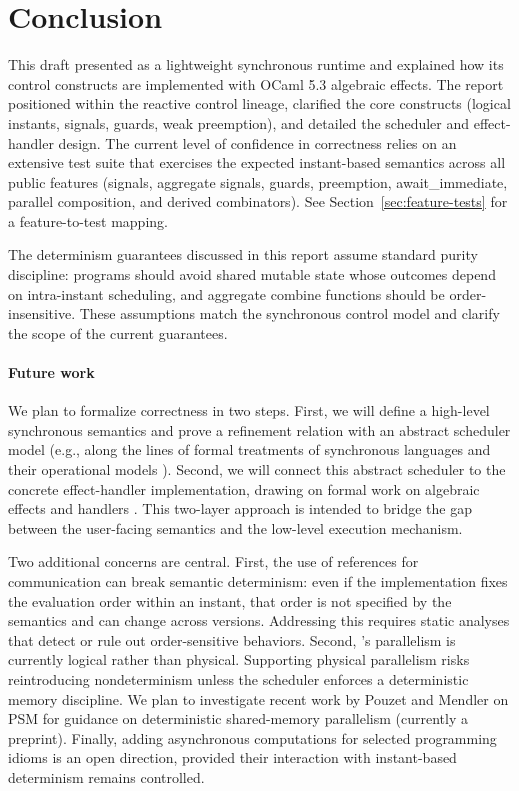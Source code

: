 \section{Conclusion}
This draft presented \tempo{} as a lightweight synchronous runtime and explained
how its control constructs are implemented with OCaml 5.3 algebraic effects.
The report positioned \tempo{} within the reactive control lineage, clarified the
core constructs (logical instants, signals, guards, weak preemption), and
detailed the scheduler and effect-handler design. The current level of
confidence in correctness relies on an extensive test suite that exercises the
expected instant-based semantics across all public features (signals, aggregate
signals, guards, preemption, await\_immediate, parallel composition, and
derived combinators).
See Section~\ref{sec:feature-tests} for a feature-to-test mapping.

The determinism guarantees discussed in this report assume standard purity
discipline: programs should avoid shared mutable state whose outcomes depend on
intra-instant scheduling, and aggregate combine functions should be
order-insensitive. These assumptions match the synchronous control model and
clarify the scope of the current guarantees.

\paragraph{Future work}\label{sec:future-work}
We plan to formalize correctness in two steps. First, we will define a
high-level synchronous semantics and prove a refinement relation with an
abstract scheduler model (e.g., along the lines of formal treatments of
synchronous languages and their operational models
\cite{esterel1985,esterel1992,reactiveml2008}). Second, we will connect this
abstract scheduler to the concrete effect-handler implementation, drawing on
formal work on algebraic effects and handlers
\cite{plotkinpretnar2009,eff2013}. This two-layer approach is intended to
bridge the gap between the user-facing semantics and the low-level execution
mechanism.

Two additional concerns are central. First, the use of references for
communication can break semantic determinism: even if the implementation fixes
the evaluation order within an instant, that order is not specified by the
semantics and can change across versions. Addressing this requires static
analyses that detect or rule out order-sensitive behaviors. Second, \tempo{}'s
parallelism is currently logical rather than physical. Supporting physical
parallelism risks reintroducing nondeterminism unless the scheduler enforces a
deterministic memory discipline. We plan to investigate recent work by Pouzet
and Mendler on PSM for guidance on deterministic shared-memory parallelism
\cite{mendlerpouzet2025psm} (currently a preprint). Finally, adding asynchronous
computations for selected programming idioms is an open direction, provided
their interaction with instant-based determinism remains controlled.

